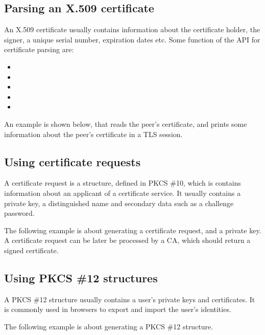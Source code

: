 \subsection{Parsing an X.509 certificate}
An X.509 certificate usually contains information about the certificate
holder, the signer, a unique serial number, expiration dates etc. Some
function of the \gnutls{} API for certificate parsing are:
\begin{itemize}
\item {}
\item {}
\item {}
\item {}
\item {}
\end{itemize}

\par
An example is shown below, that reads the peer's certificate,
and prints some information about the peer's certificate in a TLS session.



\subsection{Using certificate requests}
A certificate request is a structure, defined in PKCS \#10, which
is contains information about an applicant of a certificate service.
It usually contains a private key, a distinguished name and secondary
data such as a challenge password.
\par
The following example is about generating a certificate request, and
a private key. A certificate request can be later be processed by a CA,
which should return a signed certificate.



\subsection{Using PKCS \#12 structures}
A PKCS \#12 structure usually contains a user's private keys and
certificates. It is commonly used in browsers to export and import
the user's identities.

\par
The following example is about generating a PKCS \#12 structure.

